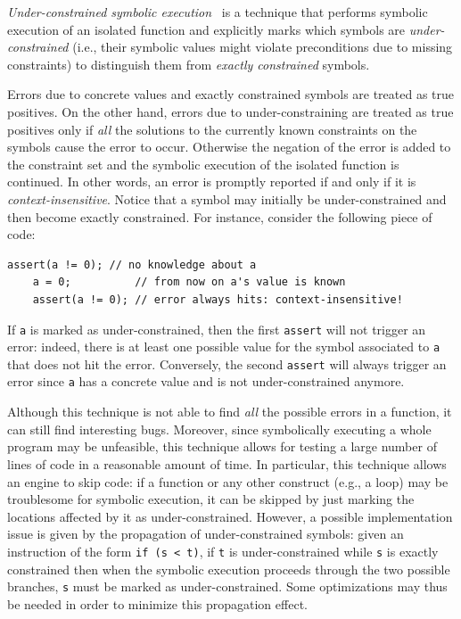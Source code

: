 {\em Under-constrained symbolic execution}~\cite{ED-ISSTA07} is a technique that performs symbolic execution of an isolated function and explicitly marks which symbols are {\em under-constrained} (i.e., their symbolic values might violate preconditions due to missing constraints) to distinguish them from {\em exactly constrained} symbols.

Errors due to concrete values and exactly constrained symbols are treated as true positives. On the other hand, errors due to under-constraining are treated as true positives only if {\em all} the solutions to the currently known constraints on the symbols cause the error to occur. Otherwise the negation of the error is added to the constraint set and the symbolic execution of the isolated function is continued. In other words, an error is  promptly reported if and only if it is {\em context-insensitive}. Notice that a symbol may initially be under-constrained and then become exactly constrained. For instance, consider the following piece of code:

    \begin{lstlisting}[basicstyle=\ttfamily\small]
    assert(a != 0); // no knowledge about a
    a = 0;          // from now on a's value is known
    assert(a != 0); // error always hits: context-insensitive! 
    \end{lstlisting}

If {\tt a} is marked as under-constrained, then the first {\tt assert} will not trigger an error: indeed, there is at least one possible value for the symbol associated to {\tt a} that does not hit the error. Conversely, the second {\tt assert} will always trigger an error since {\tt a} has a concrete value and is not under-constrained anymore.

Although this technique is not able to find {\em all} the possible errors in a function, it can still find interesting bugs. Moreover, since symbolically executing a whole program may be unfeasible, this technique allows for testing a large number of lines of code in a reasonable amount of time. In particular, this technique allows an engine to skip code: if a function or any other construct (e.g., a loop) may be troublesome for symbolic execution, it can be skipped by just marking the locations affected by it as under-constrained. However, a possible implementation issue is given by the propagation of under-constrained symbols: given an instruction of the form {\tt if (s < t)}, if {\tt t} is under-constrained while {\tt s} is exactly constrained then when the symbolic execution proceeds through the two possible branches, {\tt s} must be marked as under-constrained. Some optimizations may thus be needed in order to minimize this propagation effect.

